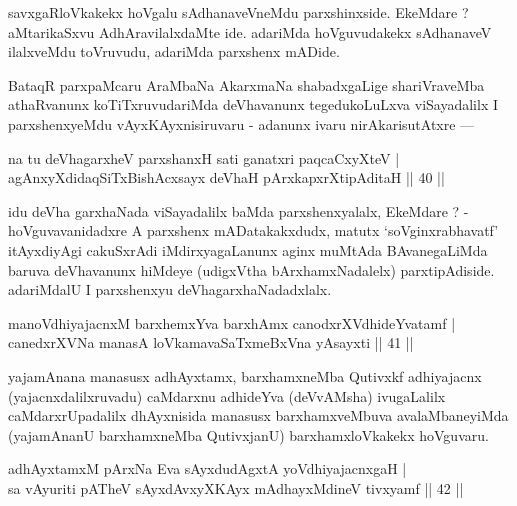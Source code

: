 \begin{artha}
savxgaRloVkakekx hoVgalu sAdhanaveVneMdu parxshinxside. EkeMdare ? aMtarikaSxvu AdhAravilalxdaMte ide. adariMda hoVguvudakekx sAdhanaveV ilalxveMdu toVruvudu, adariMda parxshenx mADide.
\end{artha}

\begin{artha}
BataqR parxpaMcaru AraMbaNa AkarxmaNa shabadxgaLige shariVraveMba athaRvanunx koTiTxruvudariMda deVhavanunx tegedukoLuLxva viSayadalilx I parxshenxyeMdu vAyxKAyxnisiruvaru - adanunx ivaru nirAkarisutAtxre ---
\end{artha}


\begin{shl}
na tu deVhagarxheV parxshanxH sati ganatxri paqcaCxyXteV |\\
agAnxyXdidaqSiTxBishAcxsayx deVhaH pArxkapxrXtipAditaH \hfill || 40 ||
\end{shl}

\begin{artha}
idu deVha garxhaNada viSayadalilx baMda parxshenxyalalx, EkeMdare ? - hoVguvavanidadxre A parxshenx mADatakakxdudx, matutx `soV\s ginxrabhavatf' itAyxdiyAgi cakuSxrAdi iMdirxyagaLanunx aginx muMtAda BAvanegaLiMda baruva deVhavanunx hiMdeye (udigxVtha bArxhamxNadalelx) parxtipAdiside. adariMdalU I parxshenxyu deVhagarxhaNadadxlalx.
\end{artha}


\begin{shl}
manoV\s dhiyajacnxM barxhemxYva barxhAmx canodxrXV\s dhideYvatamf |\\
canedxrXVNa manasA loVkamavaSaTxmeBxVna yAsayxti \hfill || 41 || 
\end{shl}

\begin{artha}
yajamAnana manasusx adhAyxtamx, barxhamxneMba Qutivxkf adhiyajacnx (yajacnxdalilxruvadu) caMdarxnu adhideYva (deVvAMsha) ivugaLalilx caMdarxrUpadalilx dhAyxnisida manasusx barxhamxveMbuva avalaMbaneyiMda (yajamAnanU barxhamxneMba QutivxjanU) barxhamxloVkakekx hoVguvaru.
\end{artha}

\begin{shl}
adhAyxtamxM pArxNa Eva sAyxdudAgxtA yoV\s dhiyajacnxgaH |\\
sa vAyuriti pATheV sAyxdAvxyXKAyx mAdhayxMdineV tivxyamf \hfill || 42 ||
\end{shl}

